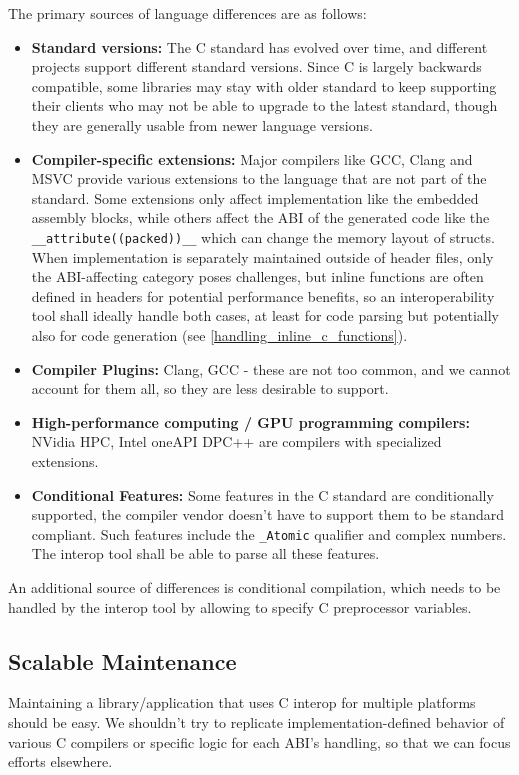 The primary sources of language differences are as follows:
\begin{itemize}
    \item \textbf{Standard versions:} The C standard has evolved over time, and different projects support different standard versions. Since C is largely backwards compatible, some libraries may stay with older standard to keep supporting their clients who may not be able to upgrade to the latest standard, though they are generally usable from newer language versions.
    \item \textbf{Compiler-specific extensions:} Major compilers like GCC, Clang and MSVC provide various extensions to the language that are not part of the standard. Some extensions only affect implementation like the embedded assembly blocks, while others affect the ABI of the generated code like the \verb|__attribute((packed))__| which can change the memory layout of structs. When implementation is separately maintained outside of header files, only the ABI-affecting category poses challenges, but inline functions are often defined in headers for potential performance benefits, so an interoperability tool shall ideally handle both cases, at least for code parsing but potentially also for code generation (see \autoref{handling_inline_c_functions}).
    \item \textbf{Compiler Plugins:} Clang, GCC - these are not too common, and we cannot account for them all, so they are less desirable to support. 
    \item \textbf{High-performance computing / GPU programming compilers:} NVidia HPC, Intel oneAPI DPC++ are compilers with specialized extensions.
    \item \textbf{Conditional Features:} Some features in the C standard are conditionally supported, the compiler vendor doesn't have to support them to be standard compliant. Such features include the \verb|_Atomic| qualifier and complex numbers. The interop tool shall be able to parse all these features.
\end{itemize}
 
An additional source of differences is conditional compilation, which needs to be handled by the interop tool by allowing to specify C preprocessor variables.

\subsection{Scalable Maintenance}
Maintaining a library/application that uses C interop for multiple platforms should be easy. We shouldn't try to replicate implementation-defined behavior of various C compilers or specific logic for each ABI's handling, so that we can focus efforts elsewhere.

